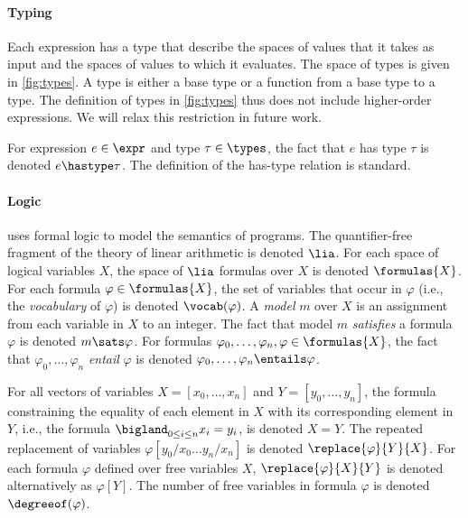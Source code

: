 
\paragraph{Typing}
%
Each expression has a type that describe the spaces of values that it
takes as input and the spaces of values to which it evaluates.
%
The space of types is given in \autoref{fig:types}.
%
A type is either a base type or a function from a base type to a type.
%
The definition of types in \autoref{fig:types} thus does not include
higher-order expressions.
%
We will relax this restriction in future work.
%

For expression $e \in \expr$ and type $\tau \in \types$, the fact that
$e$ has type $\tau$ is denoted $e \hastype \tau$.
%
The definition of the has-type relation is standard.

\paragraph{Logic}
%
\sys uses formal logic to model the semantics of programs.
%
The quantifier-free fragment of the theory of linear arithmetic is
denoted $\lia$.
%
For each space of logical variables $X$, the space of $\lia$ formulas
over $X$ is denoted $\formulas{X}$.
%
For each formula $\varphi \in \formulas{X}$, the set of variables that
occur in $\varphi$ (i.e., the \emph{vocabulary} of $\varphi$) is
denoted $\vocab(\varphi)$.
A \lia \emph{model} $m$ over $X$ is an assignment from each variable
in $X$ to an integer.
%
The fact that model $m$ \emph{satisfies} a formula $\varphi$ is
denoted $m \sats \varphi$.
%
For formulas $\varphi_0, \ldots, \varphi_n, \varphi \in \formulas{X}$,
the fact that $\varphi_0, \ldots, \varphi_n$ \emph{entail} $\varphi$
is denoted $\varphi_0, \ldots, \varphi_n \entails \varphi$.

For all vectors of variables $X = [ x_0, \ldots, x_n ]$ and $Y = [
y_0, \ldots, y_n ]$, the \lia formula constraining the equality of
each element in $X$ with its corresponding element in $Y$, i.e., the
formula $\bigland_{0 \leq i \leq n} x_i = y_i$, is denoted $X = Y$.
%
The repeated replacement of variables $\varphi[ y_0 / x_0 \ldots y_{n}
/ x_{n} ]$ is denoted $\replace{\varphi}{Y}{X}$.
%
For each formula $\varphi$ defined over free variables $X$,
$\replace{\varphi}{X}{Y}$ is denoted alternatively as $\varphi[Y]$.
%
The number of free variables in formula $\varphi$ is denoted
$\degreeof(\varphi)$.


